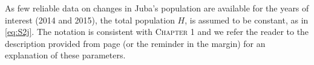


As few reliable data on changes in Juba's population are available for the years of interest (2014 and 2015), the total population $H$, is assumed to be constant, as in \eqref{eq:S2j}. The notation is consistent with \textsc{Chapter 1} and we refer the reader to the description provided from page \pageref{eq:I2} (or the reminder in the margin) for an explanation of these parameters.


